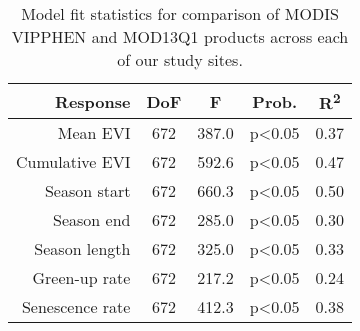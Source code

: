 \begin{table}[h]
\centering
\begin{tabular}{rcccc}
  \hline
Response & DoF & F & Prob. & R\textsuperscript{2} \\ 
  \hline
Mean EVI & 672 & 387.0 & p<0.05 & 0.37 \\ 
  Cumulative EVI & 672 & 592.6 & p<0.05 & 0.47 \\ 
  Season start & 672 & 660.3 & p<0.05 & 0.50 \\ 
  Season end & 672 & 285.0 & p<0.05 & 0.30 \\ 
  Season length & 672 & 325.0 & p<0.05 & 0.33 \\ 
  Green-up rate & 672 & 217.2 & p<0.05 & 0.24 \\ 
  Senescence rate & 672 & 412.3 & p<0.05 & 0.38 \\ 
   \hline
\end{tabular}
\caption{Model fit statistics for comparison of MODIS VIPPHEN and MOD13Q1 products across each of our study sites.} 
\label{annot_df}
\end{table}

